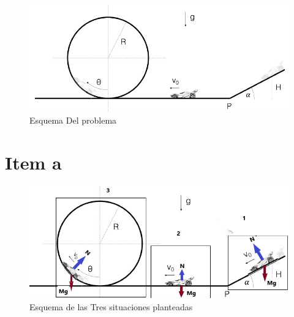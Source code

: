 \documentclass[fleqn,10pt]{SelfArx} %
\affiliation{*\textbf{Mail}: ezequielremus@gmail.com} %
\begin{document}
	\flushbottom 
	\maketitle 
	\tableofcontents 
	\thispagestyle{empty} 
\newpage

\begin{figure}[h] %
\includegraphics[scale=0.4]{figuras/fig1.jpg}
\caption{Esquema Del problema}
\label{fig:1}
\end{figure}
 \newpage
\section*{Item a}

\begin{figure}[h] 
	\includegraphics[scale=0.4]{figuras/fig2.jpg}
	\caption{Esquema de las Tres situaciones planteadas}
	\label{fig:2}
\end{figure}
\end{document}

